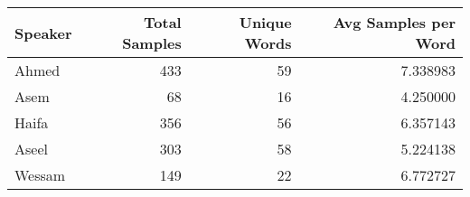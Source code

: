 \begin{tabular}{lrrr}
\toprule
Speaker & Total Samples & Unique Words & Avg Samples per Word \\
\midrule
Ahmed & 433 & 59 & 7.338983 \\
Asem & 68 & 16 & 4.250000 \\
Haifa & 356 & 56 & 6.357143 \\
Aseel & 303 & 58 & 5.224138 \\
Wessam & 149 & 22 & 6.772727 \\
\bottomrule
\end{tabular}
